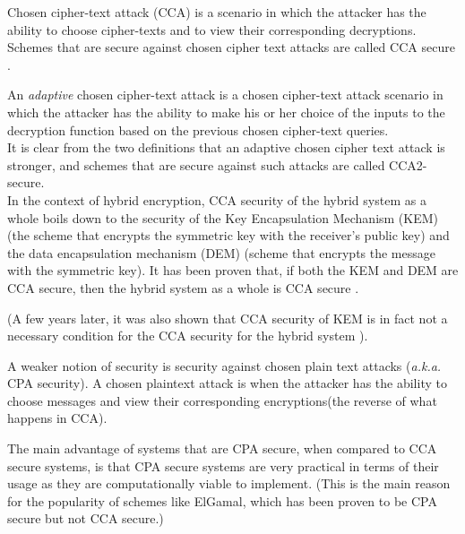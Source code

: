 Chosen cipher-text attack (CCA) is a scenario in which the attacker has the ability to choose cipher-texts and to view their corresponding decryptions.
Schemes that are secure against chosen cipher text attacks are called CCA secure \cite{springer_cca}.

An \emph{adaptive} chosen cipher-text attack is a chosen cipher-text attack scenario in which the attacker has the ability to make his or her choice of the inputs to the decryption function based on the previous chosen cipher-text queries.\\

It is clear from the two definitions that an adaptive chosen cipher text attack is stronger, and schemes that are secure against such attacks are called CCA2-secure.\\

In the context of hybrid encryption, CCA security of the hybrid system as a whole boils down to the security of the Key Encapsulation Mechanism (KEM) (the scheme that encrypts the symmetric key with the receiver's public key) and the data encapsulation mechanism (DEM) (scheme that encrypts the message with the symmetric key).
It has been proven that, if both the KEM and DEM are CCA secure, then the hybrid system as a whole is CCA secure \cite{cryptoeprint:2001:108}.

(A few years later, it was also shown that CCA security of KEM is in fact not a necessary condition for the CCA security for the hybrid system \cite{kuro_des}).

A weaker notion of security is security against chosen plain text attacks (\emph{a.k.a.} CPA security).
A chosen plaintext attack is when the attacker has the ability to choose messages and view their corresponding encryptions(the reverse of what happens in CCA).

The main advantage of systems that are CPA secure, when compared to CCA secure systems, is that CPA secure systems are very practical in terms of their usage as they are computationally viable to implement.
(This is the main reason for the popularity of schemes like ElGamal, which has been proven to be CPA secure but not CCA secure.)
